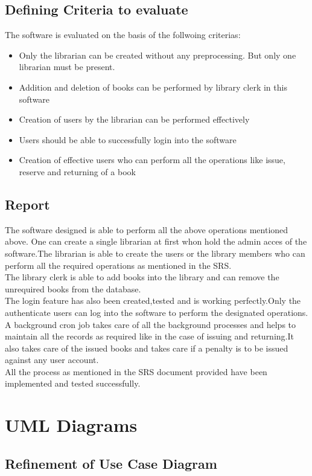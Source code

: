 \documentclass{article}
\begin{document}
\subsection{Defining Criteria to evaluate}
The software is evaluated on the basis of the follwoing criterias:
\begin{itemize}
\item Only the librarian can be created without any preprocessing. But only one librarian must be present.
\item Addition and deletion of books can be performed by library clerk in this software
\item Creation of users by the librarian can be performed effectively
\item Users should be able to successfully login into the software
\item Creation of effective users who can perform all the operations like issue, reserve and returning of a book
\end{itemize}
\subsection{Report}
The software designed is able to perform all the above operations mentioned above. One can create a single librarian at first whon hold the admin acces of the software.The librarian is able to create the users or the library members who can perform all the required operations as mentioned in the SRS.
\\The library clerk is able to add books into the library and can remove the unrequired books from the database.
\\The login feature has also been created,tested and is working perfectly.Only the authenticate users can log into the software to perform the designated operations.
\\A background cron job takes care of all the background processes and helps to maintain all the records as required like in the case of issuing and returning.It also takes care of the issued books and takes care if a penalty is to be issued against any user account.
\\All the process as mentioned in the SRS document provided have been implemented and tested successfully.

\section{UML Diagrams}

\subsection{Refinement of Use Case Diagram}
\end{document}
